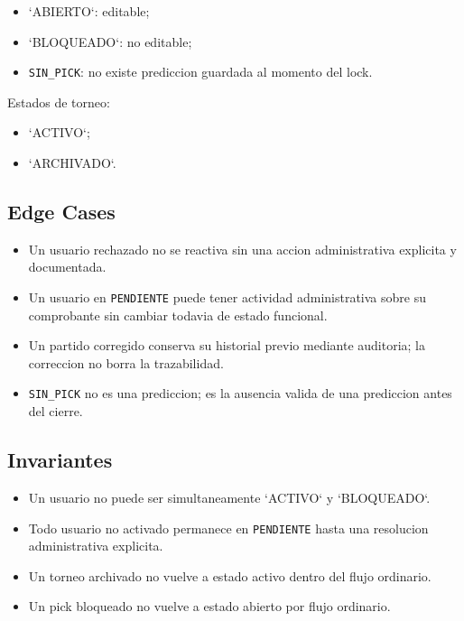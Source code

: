\begin{itemize}
  \item `ABIERTO`: editable;
  \item `BLOQUEADO`: no editable;
  \item \texttt{SIN\_PICK}: no existe prediccion guardada al momento del lock.
\end{itemize}

Estados de torneo:

\begin{itemize}
  \item `ACTIVO`;
  \item `ARCHIVADO`.
\end{itemize}

\subsection{Edge Cases}

\begin{itemize}
  \item Un usuario rechazado no se reactiva sin una accion administrativa explicita y documentada.
  \item Un usuario en \texttt{PENDIENTE} puede tener actividad administrativa sobre su comprobante sin cambiar todavia de estado funcional.
  \item Un partido corregido conserva su historial previo mediante auditoria; la correccion no borra la trazabilidad.
  \item \texttt{SIN\_PICK} no es una prediccion; es la ausencia valida de una prediccion antes del cierre.
\end{itemize}

\subsection{Invariantes}

\begin{itemize}
  \item Un usuario no puede ser simultaneamente `ACTIVO` y `BLOQUEADO`.
  \item Todo usuario no activado permanece en \texttt{PENDIENTE} hasta una resolucion administrativa explicita.
  \item Un torneo archivado no vuelve a estado activo dentro del flujo ordinario.
  \item Un pick bloqueado no vuelve a estado abierto por flujo ordinario.
\end{itemize}

